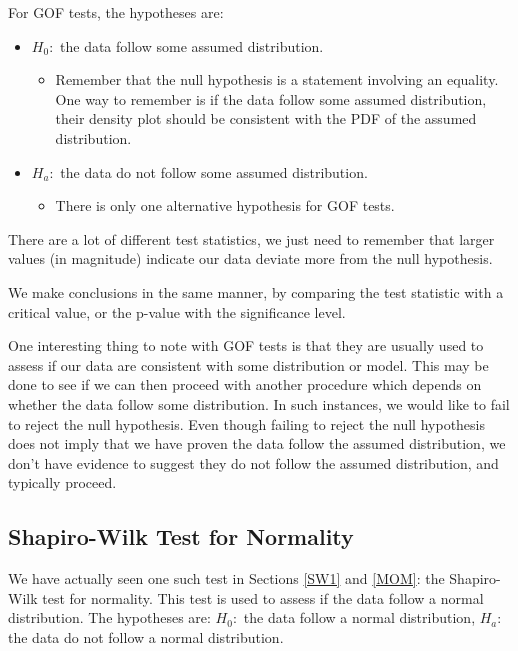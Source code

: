 \documentclass[
]{book}
\providecommand{\tightlist}{%
  \setlength{\itemsep}{0pt}\setlength{\parskip}{0pt}}
\begin{document}
For GOF tests, the hypotheses are:

\begin{itemize}
\tightlist
\item
  \(H_0:\) the data follow some assumed distribution.

  \begin{itemize}
  \tightlist
  \item
    Remember that the null hypothesis is a statement involving an equality. One way to remember is if the data follow some assumed distribution, their density plot should be consistent with the PDF of the assumed distribution.
  \end{itemize}
\item
  \(H_a:\) the data do not follow some assumed distribution.

  \begin{itemize}
  \tightlist
  \item
    There is only one alternative hypothesis for GOF tests.
  \end{itemize}
\end{itemize}

There are a lot of different test statistics, we just need to remember that larger values (in magnitude) indicate our data deviate more from the null hypothesis.

We make conclusions in the same manner, by comparing the test statistic with a critical value, or the p-value with the significance level.

One interesting thing to note with GOF tests is that they are usually used to assess if our data are consistent with some distribution or model. This may be done to see if we can then proceed with another procedure which depends on whether the data follow some distribution. In such instances, we would like to fail to reject the null hypothesis. Even though failing to reject the null hypothesis does not imply that we have proven the data follow the assumed distribution, we don't have evidence to suggest they do not follow the assumed distribution, and typically proceed.

\hypertarget{shapiro-wilk-test-for-normality}{%
\subsection{Shapiro-Wilk Test for Normality}\label{shapiro-wilk-test-for-normality}}

We have actually seen one such test in Sections \ref{SW1} and \ref{MOM}: the Shapiro-Wilk test for normality. This test is used to assess if the data follow a normal distribution. The hypotheses are: \(H_0:\) the data follow a normal distribution, \(H_a:\) the data do not follow a normal distribution.
\end{document}
